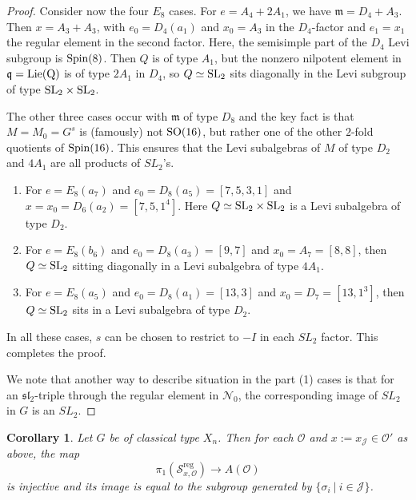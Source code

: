 \documentclass{amsart}
\newtheorem{corollary}[theorem]{Corollary}
\theoremstyle{definition}
\DeclareMathOperator{\reg}{reg}
\newcommand{\cS}{\mathcal{S}}
\newcommand{\frakm}{\mathfrak{m}}
\newcommand{\0}{\mathcal{O}}
\begin{document}
\begin{proof}
Consider now the four $E_8$ cases.  
For $e = A_4+2A_1$, we have 
$\frakm = D_4+A_3$.
Then $x= A_3+A_3$, with $e_0 = D_4(a_1)$ and $x_0=A_3$ in the $D_4$-factor and $e_1 =x_1$ the regular element in the second factor. 
Here, the semisimple part of the $D_4$ Levi subgroup is $\rm{Spin}(8)$.
Then $Q$ is of type $A_1$, but the nonzero nilpotent element in $\mathfrak{q} = \rm{Lie}(Q)$ is of type $2A_1$ in $D_4$, so $Q\simeq \rm{SL}_2$ sits diagonally in the Levi subgroup of type $\rm{SL}_2 \times \rm{SL}_2$.

The other three cases occur with $\frakm$ of type $D_8$ and 
the key fact is that $M=M_0=G^s$ is (famously) not $\rm{SO}(16)$, but rather one of the other $2$-fold quotients of $\rm{Spin}(16)$.  
This ensures that the Levi subalgebras of $M$ of type $D_2$ and $4A_1$ are all products of $SL_2$'s.
\begin{enumerate}
 \item For $e = E_8(a_7)$ and $e_0= D_8(a_5) = [7,5,3,1]$ and 
 $x=x_0 =D_6(a_2)= [7,5,1^4]$.  
 Here $Q \simeq \rm{SL}_2 \times \rm{SL}_2$ is a Levi subalgebra of type $D_2$.
    \item For $e = E_8(b_6)$ and $e_0= D_8(a_3)=[9,7]$ and $x_0=A_7=[8,8]$, 
    then $Q \simeq \rm{SL}_2$  sitting diagonally in a Levi subalgebra of type $4A_1$.
    \item For $e=E_8(a_5)$ and $e_0= D_8(a_1) = [13,3]$ and $x_0 = D_7 = [13,1^3]$, then 
    $Q \simeq \rm{SL}_2$ sits in a Levi subalgebra of type $D_2$.
\end{enumerate}
In all these cases, $s$ can be chosen to restrict to $-I$ in each $SL_2$ factor. This completes the proof.  

We note that another way to describe situation in the part (1) cases is that for an $\mathfrak{sl}_2$-triple through the regular element in $\mathcal N_0$, the corresponding image of $SL_2$ in $G$ is an $SL_2$.  
\end{proof}

\begin{corollary}
Let $G$ be of classical type $X_n$.
Then for each $\0$ and $x:=x_{\mathcal J} \in \0'$ as above, the map
$$\pi_1(\cS^{\reg}_{x, \0}) \to A(\0)$$
is injective and its image is equal to the subgroup generated
by $\{ \sigma_i \ | \ i \in \mathcal J\}$.  
\end{corollary}
\end{document}
